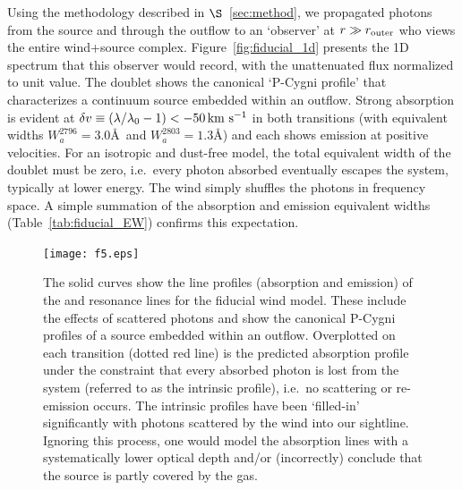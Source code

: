 \documentclass[]{emulateapj}
\begin{document}
Using the methodology described in $\S$~\ref{sec:method}, we
propagated photons from the source and through the outflow to an
`observer' at $r \gg r_{\rm outer}$ who views the entire wind+source
complex.  Figure~\ref{fig:fiducial_1d} presents the 1D spectrum
that this observer would record, with the unattenuated flux
normalized to unit value.   The  doublet
shows the canonical `P-Cygni profile' that characterizes a continuum
source embedded within an outflow.  Strong absorption is evident at
$\delta v  \equiv (\lambda/\lambda_0 - 1) < -50 \, {\rm km~s^{-1}}$ in both
transitions (with equivalent widths $W^{2796}_a =
3.0$\AA\ and $W^{2803}_a = 1.3$\AA) and each shows emission at
positive velocities.  For an isotropic and dust-free model, the
total equivalent width of the doublet must be zero,
i.e.\ every photon
absorbed eventually escapes the system, typically at lower
energy.  The wind simply shuffles the photons in frequency space.
A simple summation of the absorption and emission equivalent widths
(Table~\ref{tab:fiducial_EW}) confirms this expectation.


\begin{figure}
\texttt{[image: f5.eps]}
\caption{
The solid curves show the line profiles (absorption and emission) of
the  and  resonance lines for the fiducial wind
model.  These include the effects of scattered photons and show the
canonical P-Cygni profiles of a source 
embedded within an outflow.  Overplotted on each transition (dotted
red line) is
the predicted absorption profile under the constraint that every
absorbed photon is lost from the system (referred to as the
intrinsic profile), i.e.\ no scattering or
re-emission occurs.   The intrinsic profiles have been `filled-in' 
significantly with photons scattered by the wind into our sightline.  Ignoring this
process, one would model the absorption lines with a systematically lower
optical depth and/or (incorrectly) conclude that the source is partly covered by the
gas.  
}
\label{fig:noemiss}
\end{figure}
\end{document}
